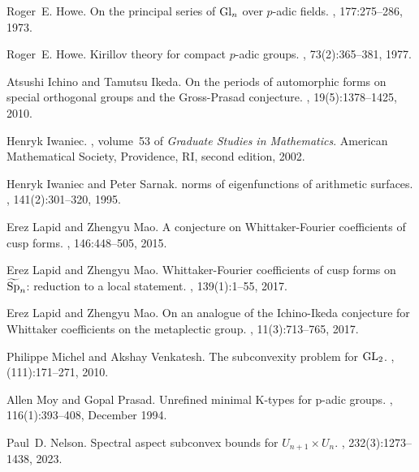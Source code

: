 \documentclass[reqno]{amsart}
\theoremstyle{plain} \newtheorem{theorem} {Theorem} \newtheorem{conjecture} {Conjecture} \newtheorem{corollary} [theorem] {Corollary} \newtheorem{proposition} [theorem] {Proposition} \newtheorem{fact} [theorem] {Fact}
\theoremstyle{definition} \newtheorem{definition} [theorem] {Definition}
\theoremstyle{itplain} %
\begin{document}
\begin{thebibliography}{10}
Roger~E. Howe.
\newblock On the principal series of {${\rm Gl}\sb{n}$} over {$p$}-adic fields.
, 177:275--286, 1973.

Roger~E. Howe.
\newblock Kirillov theory for compact {$p$}-adic groups.
, 73(2):365--381, 1977.

Atsushi Ichino and Tamutsu Ikeda.
\newblock On the periods of automorphic forms on special orthogonal groups and
  the {G}ross-{P}rasad conjecture.
, 19(5):1378--1425, 2010.

Henryk Iwaniec.
, volume~53 of {\em
  Graduate Studies in Mathematics}.
\newblock American Mathematical Society, Providence, RI, second edition, 2002.

Henryk Iwaniec and Peter Sarnak.
 norms of eigenfunctions of arithmetic surfaces.
, 141(2):301--320, 1995.

Erez Lapid and Zhengyu Mao.
\newblock A conjecture on {W}hittaker-{F}ourier coefficients of cusp forms.
, 146:448--505, 2015.

Erez Lapid and Zhengyu Mao.
\newblock Whittaker-{F}ourier coefficients of cusp forms on {$\widetilde{\rm
  Sp}_n$}: reduction to a local statement.
, 139(1):1--55, 2017.

Erez Lapid and Zhengyu Mao.
\newblock On an analogue of the {I}chino-{I}keda conjecture for {W}hittaker
  coefficients on the metaplectic group.
, 11(3):713--765, 2017.

Philippe Michel and Akshay Venkatesh.
\newblock The subconvexity problem for {${\rm GL}_2$}.
, (111):171--271, 2010.

Allen Moy and Gopal Prasad.
\newblock Unrefined minimal {{K}}-types for p-adic groups.
, 116(1):393--408, December 1994.

Paul~D. Nelson.
\newblock Spectral aspect subconvex bounds for {$U_{n+1} \times U_n$}.
, 232(3):1273--1438, 2023.


\end{thebibliography}
\end{document}
